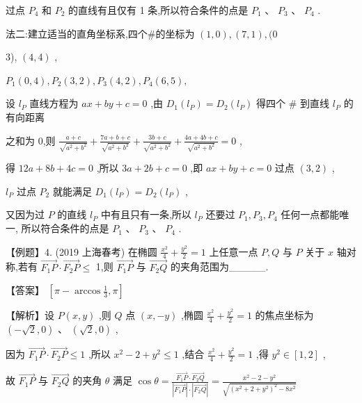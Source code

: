\documentclass[10pt]{article}
\begin{document}
过点 \({P}_{4}\) 和 \({P}_{2}\) 的直线有且仅有 1 条,所以符合条件的点是 \({P}_{1}\text{ 、 }{P}_{3}\) 、 \({P}_{4}\) .

法二:建立适当的直角坐标系,四个\#的坐标为 \(\left( {1,0}\right) ,\left( {7,1}\right) ,(0\)

3), \(\left( {4,4}\right)\) ,

\({P}_{1}\left( {0,4}\right) ,{P}_{2}\left( {3,2}\right) ,{P}_{3}\left( {4,2}\right) ,{P}_{4}\left( {6,5}\right) ,\)

设 \({l}_{P}\) 直线方程为 \({ax} + {by} + c = 0\) ,由 \({D}_{1}\left( {l}_{P}\right)  = {D}_{2}\left( {l}_{P}\right)\) 得四个 \(\#\) 到直线 \({l}_{P}\) 的有向距离

之和为 0,则 \(\frac{a + c}{\sqrt{{a}^{2} + {b}^{2}}} + \frac{{7a} + b + c}{\sqrt{{a}^{2} + {b}^{2}}} + \frac{{3b} + c}{\sqrt{{a}^{2} + {b}^{2}}} + \frac{{4a} + {4b} + c}{\sqrt{{a}^{2} + {b}^{2}}} = 0\) ,

得 \({12a} + {8b} + {4c} = 0\) ,所以 \({3a} + {2b} + c = 0\) ,即 \({ax} + {by} + c = 0\) 过点 \(\left( {3,2}\right)\) ,

\({l}_{P}\) 过点 \({P}_{2}\) 就能满足 \({D}_{1}\left( {l}_{P}\right)  = {D}_{2}\left( {l}_{P}\right)\) ,

又因为过 \(P\) 的直线 \({l}_{P}\) 中有且只有一条,所以 \({l}_{P}\) 还要过 \({P}_{1},{P}_{3},{P}_{4}\) 任何一点都能唯一, 所以符合条件的点是 \({P}_{1}\text{ 、 }{P}_{3}\text{ 、 }{P}_{4}\) .

【例题】4. (2019 上海春考) 在椭圆 \(\frac{{x}^{2}}{4} + \frac{{y}^{2}}{2} = 1\) 上任意一点 \(P,Q\) 与 \(P\) 关于 \(x\) 轴对称,若有 \(\overrightarrow{{F}_{1}P} \cdot  \overrightarrow{{F}_{2}P} \leq\) 1,则 \(\overrightarrow{{F}_{1}P}\) 与 \(\overrightarrow{{F}_{2}Q}\) 的夹角范围为\_\_\_\_\_.

【答案】 \(\left\lbrack  {\pi  - \arccos \frac{1}{3},\pi }\right\rbrack\)

【解析】设 \(P\left( {x,y}\right)\) ,则 \(Q\) 点 \(\left( {x, - y}\right)\) ,椭圆 \(\frac{{x}^{2}}{4} + \frac{{y}^{2}}{2} = 1\) 的焦点坐标为 \(\left( {-\sqrt{2},0}\right) \text{ 、 }\left( {\sqrt{2},0}\right)\) ,

因为 \(\overrightarrow{{F}_{1}P} \cdot  \overrightarrow{{F}_{2}P} \leq  1\) ,所以 \({x}^{2} - 2 + {y}^{2} \leq  1\) ,结合 \(\frac{{x}^{2}}{4} + \frac{{y}^{2}}{2} = 1\) ,得 \({y}^{2} \in  \left\lbrack  {1,2}\right\rbrack\) ,

故 \(\overrightarrow{{F}_{1}P}\) 与 \(\overrightarrow{{F}_{2}Q}\) 的夹角 \(\theta\) 满足 \(\cos \theta  = \frac{\overrightarrow{{F}_{1}P} \cdot  \overrightarrow{{F}_{2}Q}}{\left| \overrightarrow{{F}_{1}P}\right|  \cdot  \left| \overrightarrow{{F}_{2}Q}\right| } = \frac{{x}^{2} - 2 - {y}^{2}}{\sqrt{{\left( {x}^{2} + 2 + {y}^{2}\right) }^{2} - 8{x}^{2}}}\)
\end{document}
